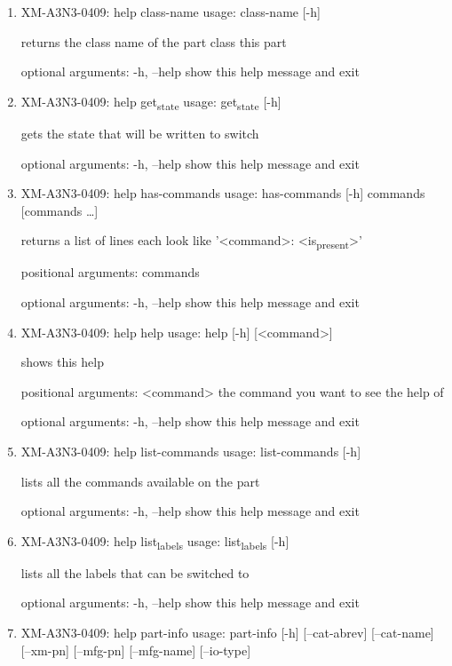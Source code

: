 \documentclass[11pt]{article}
\begin{document}
\begin{enumerate}
\item XM-A3N3-0409: help class-name
\label{sec:orgfa1e9aa}
usage: class-name [-h]

returns the class name of the part class this part

optional arguments:
  -h, --help  show this help message and exit

\item XM-A3N3-0409: help get\textsubscript{state}
\label{sec:org5a40774}
usage: get\textsubscript{state} [-h]

gets the state that will be written to switch

optional arguments:
  -h, --help  show this help message and exit

\item XM-A3N3-0409: help has-commands
\label{sec:org7982bd5}
usage: has-commands [-h] commands [commands \ldots{}]

returns a list of lines each look like '<command>: <is\textsubscript{present}>'

positional arguments:
  commands

optional arguments:
  -h, --help  show this help message and exit

\item XM-A3N3-0409: help help
\label{sec:orgc133359}
usage: help [-h] [<command>]

shows this help

positional arguments:
  <command>   the command you want to see the help of

optional arguments:
  -h, --help  show this help message and exit

\item XM-A3N3-0409: help list-commands
\label{sec:org17b46c9}
usage: list-commands [-h]

lists all the commands available on the part

optional arguments:
  -h, --help  show this help message and exit

\item XM-A3N3-0409: help list\textsubscript{labels}
\label{sec:orgbc25b97}
usage: list\textsubscript{labels} [-h]

lists all the labels that can be switched to

optional arguments:
  -h, --help  show this help message and exit

\item XM-A3N3-0409: help part-info
\label{sec:orgd29efb8}
usage: part-info  [-h] [--cat-abrev] [--cat-name] [--xm-pn] [--mfg-pn] [--mfg-name]
        [--io-type]


\end{enumerate}
\end{document}
